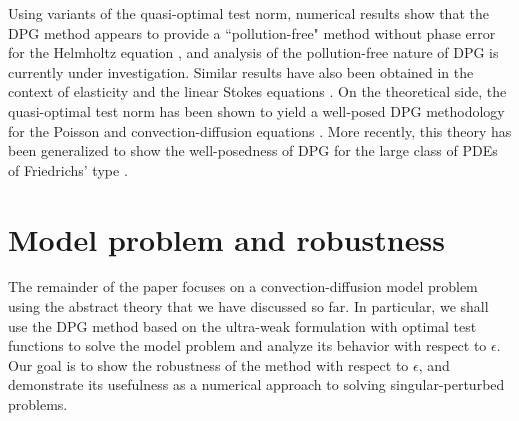 \documentclass[11pt,onecolumn]{scrartcl}
\newcommand{\eqnref}[1]{\eqref{eq:#1}}
\newcommand{\seclab}[1]{\label{sec:#1}}
\newcommand{\nor}[1]{\left\| #1 \right\|}
\newcommand{\LRp}[1]{\left( #1 \right)}
\newcommand{\LRs}[1]{\left[ #1 \right]}
\newcommand{\jump}[1] {\ensuremath{\LRs{\![#1]\!}}}
\newcommand{\uh}{\widehat{u}}
\newcommand{\Oh}{\Omega_h}
\begin{document}
%


Using variants of the quasi-optimal test norm, numerical results show that the DPG method appears to provide a ``pollution-free" method without phase error for the Helmholtz equation \cite{DPG4}, and analysis of the pollution-free nature of DPG is currently under investigation. Similar results have also been obtained in the context of elasticity \cite{DPGElas} and the linear Stokes equations \cite{Camellia}. On the theoretical side, the quasi-optimal test norm has been shown to yield a well-posed DPG methodology for the Poisson and convection-diffusion equations \cite{analysisDPG}. More recently, this theory has been generalized to show the well-posedness of DPG for the large class of PDEs of Friedrichs' type \cite{Bui-ThanhDemkowiczGhattas11b}.  

\section{Model problem and robustness}
\seclab{sec:modelSec}
The remainder of the paper focuses on a convection-diffusion model problem using the abstract theory that we
have discussed so far. In particular, we shall use the DPG method based on the ultra-weak formulation with optimal test functions to solve the model problem and analyze its behavior with respect to $\epsilon$. 
Our goal is to show the robustness of the method with respect to $\epsilon$, and demonstrate its usefulness as  a numerical approach to solving singular-perturbed problems. 
\end{document}
